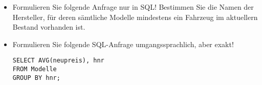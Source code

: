 \documentclass{lehramt-informatik-aufgabe}
\begin{document}
\begin{itemize}
\begin{enumerate}
\end{enumerate}

%

\item Formulieren Sie folgende Anfrage nur in SQL! Bestimmen Sie die
Namen der Hersteller, für deren sämtliche Modelle mindestens ein
Fahrzeug im aktuellern Bestand vorhanden ist.

%

\item Formulieren Sie folgende SQL-Anfrage umgangssprachlich, aber
exakt!

\begin{verbatim}
SELECT AVG(neupreis), hnr
FROM Modelle
GROUP BY hnr;
\end{verbatim}

\end{itemize}
\end{document}
